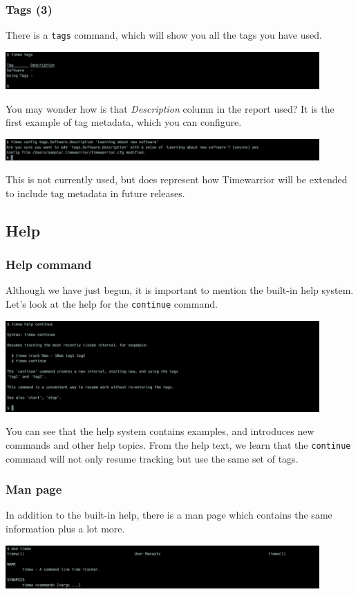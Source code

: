\documentclass[t,handout]{beamer}
\begin{document}
\begin{frame}[fragile]\frametitle{Tags (3)}
    \vfill
    There is a \verb=tags= command, which will show you all the tags you have used.

    \includegraphics[width=12cm]{images/tutorial11.png}

    You may wonder how is that \textit{Description} column in the report used? It is the first example of tag metadata, which you can configure.

    \includegraphics[width=12cm]{images/tutorial12.png}

    This is not currently used, but does represent how Timewarrior will be extended to include tag metadata in future releases.
\end{frame}

\subsection{Help}

\begin{frame}[fragile]\frametitle{Help command}
    \vfill
    Although we have just begun, it is important to mention the built-in help system. Let's look at the help for the \verb=continue= command.

    \includegraphics[width=12cm]{images/tutorial13.png}

    You can see that the help system contains examples, and introduces new commands and other help topics. From the help text, we learn that the \verb=continue= command will not only resume tracking but use the same set of tags.
\end{frame}

\begin{frame}[fragile]\frametitle{Man page}
    \vfill
    In addition to the built-in help, there is a man page which contains the same information plus a lot more.

    \includegraphics[width=12cm]{images/tutorial14.png}
\end{frame}
\end{document}
